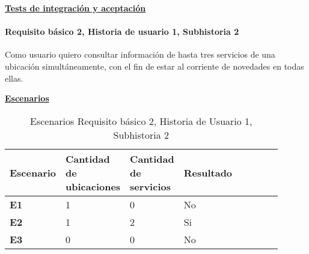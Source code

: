 \documentclass[../ei103948-project-documentation.tex]{subfiles}
\begin{document}
						\begin{center}
							\textbf{\underline{Tests de integración y aceptación}}
						\end{center}
	
						\testBasicoK

					\newpage

					\paragraph*{Requisito básico 2, Historia de usuario 1, Subhistoria 2}
					Como usuario quiero consultar información de hasta tres servicios de una ubicación simultáneamente, con el fin de estar al corriente de novedades en todas ellas.
	
						\begin{center}
							\textbf{\underline{Escenarios}}
							\begin{table}[H]
								\centering
								\begin{tabular}{|p{0.18\linewidth}|p{0.18\linewidth}|p{0.18\linewidth}|p{0.18\linewidth}|p{0.18\linewidth}|}
									\hline
									\textbf{Escenario} & \textbf{Cantidad de ubicaciones} & \textbf{Cantidad de servicios} & \textbf{Resultado} \\ \hline
									\textbf{E1}        & 1                                & 0                              & No                 \\ \hline
									\textbf{E2}        & 1                                & 2                              & Si                 \\ \hline
									\textbf{E3}        & 0                                & 0                              & No                 \\ \hline
									\end{tabular}
								\caption{Escenarios Requisito básico 2, Historia de Usuario 1, Subhistoria 2}
							\end{table}

							\descripcionBasicaL
		

\end{center}
\end{document}
